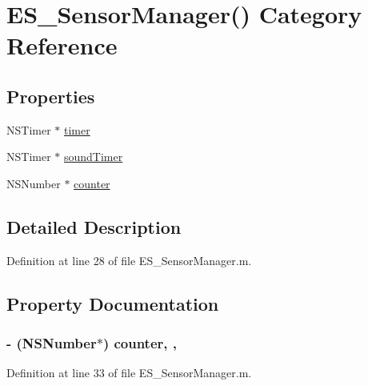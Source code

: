 \hypertarget{category_e_s___sensor_manager_07_08}{\section{E\+S\+\_\+\+Sensor\+Manager() Category Reference}
\label{category_e_s___sensor_manager_07_08}
}
\subsection*{Properties}
\begin{DoxyCompactItemize}
\item 
N\+S\+Timer $\ast$ \hyperlink{category_e_s___sensor_manager_07_08_a8146be29d5acf7277d6f9b89e5ce79a3}{timer}
\item 
N\+S\+Timer $\ast$ \hyperlink{category_e_s___sensor_manager_07_08_abd0fdbf1ac2e99c813b3c53686d12ff5}{sound\+Timer}
\item 
N\+S\+Number $\ast$ \hyperlink{category_e_s___sensor_manager_07_08_affb9e8c05e9eafc3e435f1771f32f051}{counter}
\end{DoxyCompactItemize}


\subsection{Detailed Description}


Definition at line 28 of file E\+S\+\_\+\+Sensor\+Manager.\+m.



\subsection{Property Documentation}
\hypertarget{category_e_s___sensor_manager_07_08_affb9e8c05e9eafc3e435f1771f32f051}{
\subsubsection[{counter}]{\setlength{\rightskip}{0pt plus 5cm}-\/ (N\+S\+Number$\ast$) counter\hspace{0.3cm}{\ttfamily [read]}, {\ttfamily [write]}, {\ttfamily [atomic]}}}\label{category_e_s___sensor_manager_07_08_affb9e8c05e9eafc3e435f1771f32f051}


Definition at line 33 of file E\+S\+\_\+\+Sensor\+Manager.\+m.

